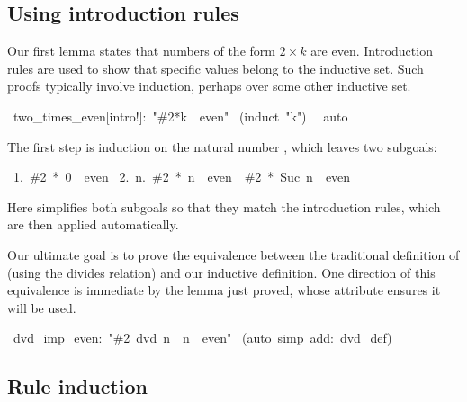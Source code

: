 \subsection{Using introduction rules}

Our first lemma states that numbers of the form $2\times k$ are even.
Introduction rules are used to show that specific values belong to the
inductive set.  Such proofs typically involve 
induction, perhaps over some other inductive set.
\begin{isabelle}
\ two_times_even[intro!]:\ "\#2*k\ \isasymin \ even"
\isanewline
{}\ (induct\ "k")\isanewline
\ \ auto\isanewline
{}
\end{isabelle}
%
The first step is induction on the natural number , which leaves
two subgoals:
\begin{isabelle}
\ 1.\ \#2\ *\ 0\ \isasymin \ even\isanewline
\ 2.\ \isasymAnd n.\ \#2\ *\ n\ \isasymin \ even\ \isasymLongrightarrow \ \#2\ *\ Suc\ n\ \isasymin \ even
\end{isabelle}
%
Here  simplifies both subgoals so that they match the introduction
rules, which are then applied automatically.

Our ultimate goal is to prove the equivalence between the traditional
definition of  (using the divides relation) and our inductive
definition.  One direction of this equivalence is immediate by the lemma
just proved, whose  attribute ensures it will be used.
\begin{isabelle}
\ dvd_imp_even:\ "\#2\ dvd\ n\ \isasymLongrightarrow \ n\ \isasymin \ even"\isanewline
{}\ (auto\ simp\ add:\ dvd_def)\isanewline
{}
\end{isabelle}

\subsection{Rule induction}

